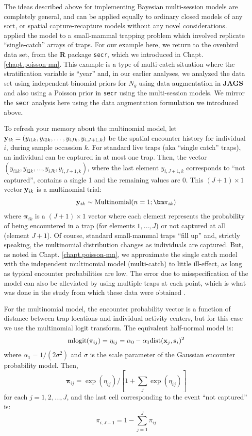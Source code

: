 The ideas described above for implementing Bayesian multi-session
models are completely general, and can be applied equally to ordinary
closed models of any sort, or spatial capture-recapture models without
any novel considerations.  \citet{royle_converse:2013} applied the
model to a small-mammal trapping problem which involved replicate
``single-catch'' arrays of traps. For our example here, we return to
the ovenbird data set, from the {\bf R} package \mbox{\tt secr}, which
we introduced in Chapt. \ref{chapt.poisson-mn}. This example is a type
of multi-catch situation where the 
stratification variable is ``year'' and, in our earlier analyses, we 
analyzed the data set using independent binomial priors for $N_{g}$
using data augmentation in {\bf JAGS} and also using a Poisson prior
in \mbox{\tt secr} using the multi-session models.
We mirror the \mbox{\tt secr} analysis here using the data
augmentation formulation we introduced above.  


To refresh your memory about the multinomial model, let ${\bf y}_{ik}
= (y_{i1k},y_{i2k},\ldots,y_{iJk},y_{i,J+1,k})$ be the spatial encounter history
for individual $i$, during sample occassion $k$.  
 For standard live traps (aka
``single catch'' traps), an individual can be captured in at most one
trap. Then, the vector $(y_{i1k},y_{i2k},\ldots,y_{iJk},y_{i,J+1,k})$,
where the last element $y_{i,J+1,k}$ corresponds to ``not captured'',
contains a single 1 and the remaining values are 0.  This $(J+1)\times
1$ vector ${\bf y}_{ik}$ is a multinomial trial:
\[
{\bf y}_{ik} \sim \mbox{Multinomial}(n=1; {\bm \pi}_{ik} )
\]
where ${\bm \pi}_{ik}$ is a $(J+1) \times 1$ vector where each element
represents the probability of being encountered in a trap (for
elements $1,\ldots,J$) or not captured at all (element $J+1$). Of
course, standard small-mammal traps ``fill up'' and, strictly
speaking, the multinomial distribution changes as individuals are
captured. But, as noted in Chapt. \ref{chapt.poisson-mn}, we
approximate the single catch model with the independent multinomial
model (multi-catch) to little ill-effect, as long as typical encounter
probabilities are low. The error due to misspecification of the model
can also be alleviated by using multiple traps at each point, which is
what was done in the study from which these data were obtained
\citep{converse_etal:2006ea, converse_etal:2006jwm}.

For the multinomial model, the encounter probability vector is a
function of distance between trap locations and individual activity
centers, but for this case we use the multinomial logit transform. The
equivalent half-normal model is:
\begin{equation}
\mbox{mlogit}(\pi_{ij}) = \eta_{ij}  =  \alpha_0 - \alpha_{1} \mbox{dist}({\bf x}_{j},{\bf s}_{i})^2   
\label{hscr.eq.mlogit}
\end{equation}
where $\alpha_{1} = 1/(2\sigma^2)$ and $\sigma$ is the scale
parameter of the Gaussian encounter probability model. Then, 
\[
{\bm \pi}_{ij} = \exp(\eta_{ij})/[ 1 + \sum_{j} \exp(\eta_{ij}) ]
\]
for each $j=1,2,\ldots,J$, and the last cell corresponding to the
event ``not captured'' is:
\[
\pi_{i,J+1} = 1- \sum_{j=1}^{J} \pi_{ij}
\]

